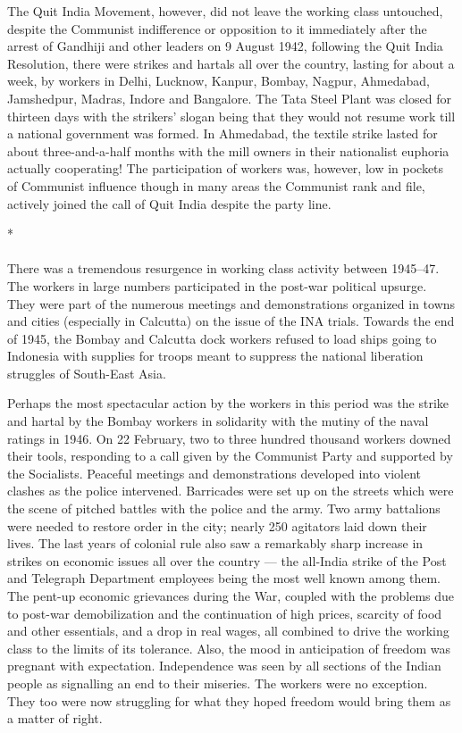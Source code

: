 The Quit India Movement, however, did not leave the working class untouched, despite the Communist indifference or opposition to it immediately after the arrest of Gandhiji and other leaders on 9 August 1942, following the Quit India Resolution, there were strikes and hartals all over the country, lasting for about a week, by workers in Delhi, Lucknow, Kanpur, Bombay, Nagpur, Ahmedabad, Jamshedpur, Madras, Indore and Bangalore. The Tata Steel Plant was closed for thirteen days with the strikers' slogan being that they would not resume work till a national government was formed. In Ahmedabad, the textile strike lasted for about three-and-a-half months with the mill owners in their nationalist euphoria actually cooperating! The participation of workers was, however, low in pockets of Communist influence though in many areas the Communist rank and file, actively joined the call of Quit India despite the party line.

\begin{center}*\end{center}

\paragraph*{}


There was a tremendous resurgence in working class activity between 1945--47. The workers in large numbers participated in the post-war political upsurge. They were part of the numerous meetings and demonstrations organized in towns and cities (especially in Calcutta) on the issue of the INA trials. Towards the end of 1945, the Bombay and Calcutta dock workers refused to load ships going to Indonesia with supplies for troops meant to suppress the national liberation struggles of South-East Asia.

Perhaps the most spectacular action by the workers in this period was the strike and hartal by the Bombay workers in solidarity with the mutiny of the naval ratings in 1946. On 22 February, two to three hundred thousand workers downed their tools, responding to a call given by the Communist Party and supported by the Socialists. Peaceful meetings and demonstrations developed into violent clashes as the police intervened. Barricades were set up on the streets which were the scene of pitched battles with the police and the army. Two army battalions were needed to restore order in the city; nearly 250 agitators laid down their lives. The last years of colonial rule also saw a remarkably sharp increase in strikes on economic issues all over the country --- the all-India strike of the Post and Telegraph Department employees being the most well known among them. The pent-up economic grievances during the War, coupled with the problems due to post-war demobilization and the continuation of high prices, scarcity of food and other essentials, and a drop in real wages, all combined to drive the working class to the limits of its tolerance. Also, the mood in anticipation of freedom was pregnant with expectation. Independence was seen by all sections of the Indian people as signalling an end to their miseries. The workers were no exception. They too were now struggling for what they hoped freedom would bring them as a matter of right.
